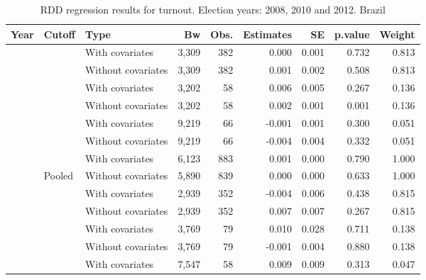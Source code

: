 \documentclass[
  12pt,
]{article}
\begin{document}
\begin{table}[H]

\caption{\label{tab:reg.part}RDD regression results for turnout. Election years: 2008, 2010 and 2012. Brazil}
\centering
\begin{tabular}[t]{lllrrrrrr}
\toprule
Year & Cutoff & Type & Bw & Obs. & Estimates & SE & p.value & Weight\\
\midrule
 &  & With covariates & 3,309 & 382 & 0.000 & 0.001 & 0.732 & 0.813\\


 & \multirow{-2}{*}{\raggedright\arraybackslash 20000} & Without covariates & 3,309 & 382 & 0.001 & 0.002 & 0.508 & 0.813\\


 &  & With covariates & 3,202 & 58 & 0.006 & 0.005 & 0.267 & 0.136\\


 & \multirow{-2}{*}{\raggedright\arraybackslash 40000} & Without covariates & 3,202 & 58 & 0.002 & 0.001 & 0.001 & 0.136\\


 &  & With covariates & 9,219 & 66 & -0.001 & 0.001 & 0.300 & 0.051\\


 & \multirow{-2}{*}{\raggedright\arraybackslash 60000} & Without covariates & 9,219 & 66 & -0.004 & 0.004 & 0.332 & 0.051\\


 &  & With covariates & 6,123 & 883 & 0.001 & 0.000 & 0.790 & 1.000\\


\multirow{-8}{*}{\raggedright\arraybackslash 2008} & Pooled & Without covariates & 5,890 & 839 & 0.000 & 0.000 & 0.633 & 1.000\\
\cmidrule{1-9}
 &  & With covariates & 2,939 & 352 & -0.004 & 0.006 & 0.438 & 0.815\\


 & \multirow{-2}{*}{\raggedright\arraybackslash 20000} & Without covariates & 2,939 & 352 & 0.007 & 0.007 & 0.267 & 0.815\\


 &  & With covariates & 3,769 & 79 & 0.010 & 0.028 & 0.711 & 0.138\\


 & \multirow{-2}{*}{\raggedright\arraybackslash 40000} & Without covariates & 3,769 & 79 & -0.001 & 0.004 & 0.880 & 0.138\\


 &  & With covariates & 7,547 & 58 & 0.009 & 0.009 & 0.313 & 0.047\\



\end{tabular}
\end{table}
\end{document}
